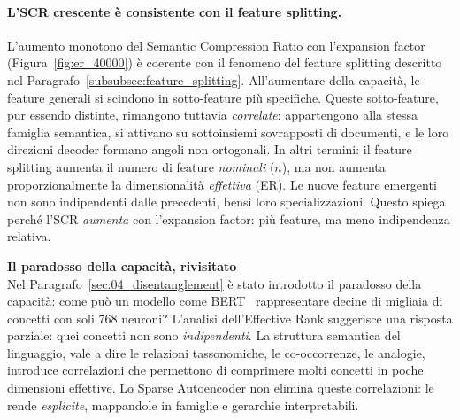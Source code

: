 \paragraph{L'SCR crescente è consistente con il feature splitting.}
L'aumento monotono del Semantic Compression Ratio con l'expansion factor (Figura~\ref{fig:er_40000}) è coerente con il fenomeno del feature splitting descritto nel Paragrafo~\ref{subsubsec:feature_splitting}. All'aumentare della capacità, le feature generali si scindono in sotto-feature più specifiche. Queste sotto-feature, pur essendo distinte, rimangono tuttavia \textit{correlate}: appartengono alla stessa famiglia semantica, si attivano su sottoinsiemi sovrapposti di documenti, e le loro direzioni decoder formano angoli non ortogonali.
In altri termini: il feature splitting aumenta il numero di feature \textit{nominali} ($n$), ma non aumenta proporzionalmente la dimensionalità \textit{effettiva} (ER). Le nuove feature emergenti non sono indipendenti dalle precedenti, bensì loro specializzazioni. Questo spiega perché l'SCR \textit{aumenta} con l'expansion factor: più feature, ma meno indipendenza relativa.
\begin{notebox}
\textbf{Il paradosso della capacità, rivisitato}\\[0.5em]
Nel Paragrafo~\ref{sec:04_disentanglement} è stato introdotto il paradosso della capacità: come può un modello come BERT~\parencite{devlin2018bert} rappresentare decine di migliaia di concetti con soli 768 neuroni?
L'analisi dell'Effective Rank suggerisce una risposta parziale: quei concetti non sono \textit{indipendenti}. La struttura semantica del linguaggio, vale a dire le relazioni tassonomiche, le co-occorrenze, le analogie, introduce correlazioni che permettono di comprimere molti concetti in poche dimensioni effettive.
Lo Sparse Autoencoder non elimina queste correlazioni: le rende \textit{esplicite}, mappandole in famiglie e gerarchie interpretabili.
\end{notebox}